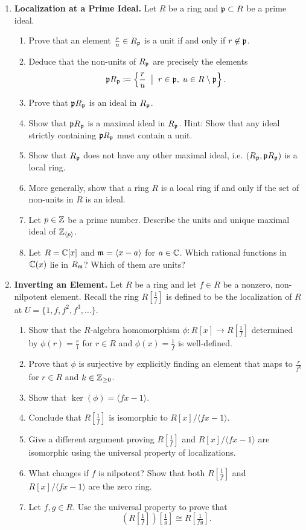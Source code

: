 \documentclass[12pt,reqno]{amsart}
\begin{document}
\begin{enumerate}[leftmargin=*,resume]

\item \textbf{Localization at a Prime Ideal.} Let $R$ be a ring and $\mathfrak{p} \subset R$ be a prime ideal.
\begin{enumerate}
	\item Prove that an element $\frac{r}{u} \in R_{\mathfrak{p}}$ is a unit if and only if $r \not \in \mathfrak{p}$.
	\item Deduce that the non-units of $R_{\mathfrak{p}}$ are precisely the elements
	\[
	\mathfrak{p} R_{\mathfrak{p}} \coloneqq \left\{ \frac{r}{u} \;\; \big|\;\; r \in \mathfrak{p},\; u\in R\setminus \mathfrak{p}\right\}.
	\]
	\item Prove that $\mathfrak{p} R_{\mathfrak{p}}$ is an ideal in $R_{\mathfrak{p}}$. 
	\item Show that $\mathfrak{p} R_{\mathfrak{p}}$ is a maximal ideal in $R_{\mathfrak{p}}$. Hint: Show that any ideal strictly containing $\mathfrak{p} R_{\mathfrak{p}}$ must contain a unit.
	\item Show that $R_{\mathfrak{p}}$ does not have any other maximal ideal, i.e. $(R_{\mathfrak{p}}, \mathfrak{p} R_{\mathfrak{p}})$ is a local ring. 
	\item More generally, show that a ring $R$ is a local ring if and only if the set of non-units in $R$ is an ideal. 
	\item Let $p\in \mathbb{Z}$ be a prime number. Describe the units and unique maximal ideal of $\mathbb{Z}_{\langle p\rangle}$. 
	\item Let $R=\mathbb{C}[x]$ and $\mathfrak{m} = \langle x-a\rangle$ for $a \in \mathbb{C}$.  Which rational functions in $\mathbb{C}(x)$ lie in $R_{\mathfrak{m}}$? Which of them are units?
\end{enumerate}

\item \textbf{Inverting an Element.} Let $R$ be a ring and let $f\in R$ be a nonzero, non-nilpotent element. Recall the ring $R[\frac{1}{f}]$ is defined to be the localization of $R$ at $U=\{1,f,f^2,f^3,\ldots\}$. 
\begin{enumerate}
	\item Show that the $R$-algebra homomorphism $\phi:R[x] \to R[\frac{1}{f}]$ determined by $\phi(r)=\frac{r}{1}$ for $r\in R$ and $\phi(x)=\frac{1}{f}$ is well-defined.
	\item Prove that $\phi$ is surjective by explicitly finding an element that maps to $\frac{r}{f^{k}}$ for $r\in R$ and $k\in \mathbb{Z}_{\geq0}$. 
	\item Show that $\ker(\phi) = \langle fx - 1\rangle$. 
	\item Conclude that $R[\frac{1}{f}]$ is isomorphic to $R[x]/\langle fx-1\rangle$.
	\item Give a different argument proving  $R[\frac{1}{f}]$ and $R[x]/\langle fx-1\rangle$ are isomorphic using the universal property of localizations. 
	\item What changes if $f$ is nilpotent? Show that both $R[\frac{1}{f}]$ and $R[x]/\langle fx-1\rangle$ are the zero ring.
	\item Let $f,g\in R$. Use the universal property to prove that
	\[
	\left(R\left[\tfrac{1}{f}\right]\right)\left[\tfrac{1}{g}\right]\cong R\left[\tfrac{1}{fg}\right].
	\]
\end{enumerate}
\end{enumerate}
\end{document}
